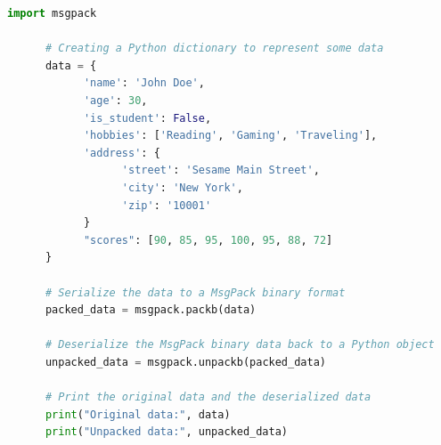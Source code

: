 \begin{lstlisting}[language=Python, caption=MsgPack Serialization and Deserialization in Python]
      import msgpack

      # Creating a Python dictionary to represent some data
      data = {
            'name': 'John Doe',
            'age': 30,
            'is_student': False,
            'hobbies': ['Reading', 'Gaming', 'Traveling'],
            'address': {
                  'street': 'Sesame Main Street',
                  'city': 'New York',
                  'zip': '10001'
            }
            "scores": [90, 85, 95, 100, 95, 88, 72]
      }

      # Serialize the data to a MsgPack binary format
      packed_data = msgpack.packb(data)

      # Deserialize the MsgPack binary data back to a Python object
      unpacked_data = msgpack.unpackb(packed_data)

      # Print the original data and the deserialized data
      print("Original data:", data)
      print("Unpacked data:", unpacked_data)
\end{lstlisting}

